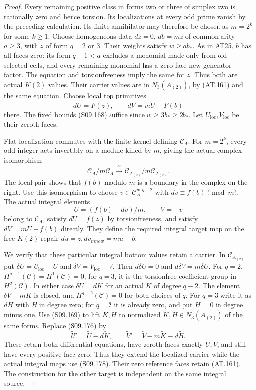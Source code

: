 \begin{proof}
Every remaining positive class in forms two or three of
simplex two is rationally zero and hence torsion.
Its localizations at every odd prime vanish by the preceding
calculation. Its finite annihilator may therefore be chosen
as $m=2^k$ for some $k\geq1$. Choose homogeneous data
$dz=0$, $db=mz$ of common arity $a\geq3$, with $z$ of
form $q=2$ or $3$. Their weights satisfy $w\geq ab_*$.
As in AT25, $b$ has all faces zero: its form $q-1<a$
excludes a monomial made only from old selected cells, and
every remaining monomial has a zero-face new-generator factor.
The equation and torsionfreeness imply the same for $z$.
Thus both are actual $K(2)$ values.
Their carrier values are in $N_3(A_{(2)})$, by (AT.161)
and the same equation. Choose local top primitives
\[
                 d\widetilde U=F(z),\qquad
                 d\widetilde V=m\widetilde U-F(b)
 \tag{S09.176}
\]
there. The fixed bounds (S09.168) suffice since
$w\geq3b_*\geq2b_*$. Let $U_{\mathrm{loc}},V_{\mathrm{loc}}$
be their zeroth faces.

Flat localization commutes with the finite kernel defining
$\mathcal C_A$. For $m=2^k$, every odd integer acts invertibly
on a module killed by $m$, giving the actual complex isomorphism
\[
 \mathcal C_A/m\mathcal C_A
        \xrightarrow{\;\cong\;}
 \mathcal C_{A_{(2)}}/m\mathcal C_{A_{(2)}}.
 \tag{S09.177}
\]
The local pair shows that $f(b)$ modulo $m$ is a boundary
in the complex on the right. Use this isomorphism to choose
$v\in\mathcal C_A^{w,q-2}$ with $dv\equiv f(b)\pmod m$.
The actual integral elements
\[
             U=(f(b)-dv)/m,\qquad V=-v
 \tag{S09.178}
\]
belong to $\mathcal C_A$, satisfy $dU=f(z)$ by
torsionfreeness, and satisfy $dV=mU-f(b)$ directly.
They define the required integral target map on the free
$K(2)$ repair $du=z,dv_{
m new}=mu-b$.

We verify that these particular integral bottom values retain
a carrier. In $\mathcal C_{A_{(2)}}$ put
$\delta U=U_{\mathrm{loc}}-U$ and
$\delta V=V_{\mathrm{loc}}-V$. Then
$d\delta U=0$ and $d\delta V=m\delta U$.
For $q=2$, $H^{q-1}(\mathcal C)=H^1(\mathcal C)=0$;
for $q=3$, it is the torsionfree coefficient group in
$H^2(\mathcal C)$. In either case $\delta U=dK$ for an
actual $K$ of degree $q-2$. The element $\delta V-mK$ is
closed, and $H^{q-2}(\mathcal C)=0$ for both choices of $q$.
For $q=3$ write it as $dH$ with $H$ in degree zero;
for $q=2$ it is already zero, and put $H=0$ in degree minus one.
Use (S09.169) to lift $K,H$ to normalized
$\widetilde K,\widetilde H\in N_3(A_{(2)})$ of the same forms.
Replace (S09.176) by
\[
 \widetilde U'=\widetilde U-d\widetilde K,\qquad
 \widetilde V'=\widetilde V-m\widetilde K-d\widetilde H.
 \tag{S09.179}
\]
These retain both differential equations, have zeroth faces
exactly $U,V$, and still have every positive face zero.
Thus they extend the localized carrier while the actual
integral maps use (S09.178). Their zero reference faces retain
(AT.161). The construction for the other target is independent
on the same integral source.


\end{proof}
